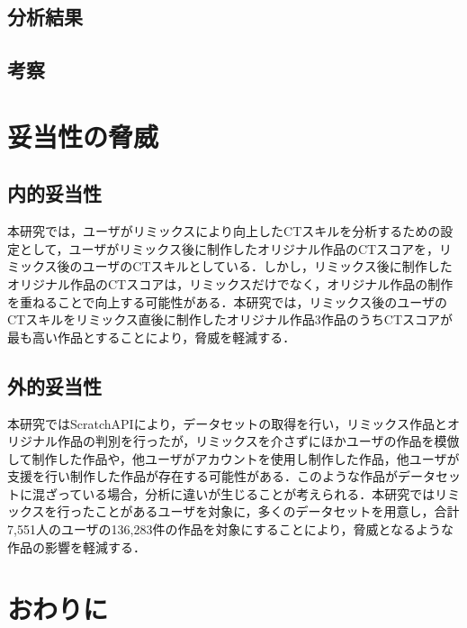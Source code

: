 \documentclass[11pt]{jreport}
\begin{document}
\section{分析結果}
\section{考察}


\chapter{妥当性の脅威}

\section{内的妥当性}
本研究では，ユーザがリミックスにより向上したCTスキルを分析するための設定として，ユーザがリミックス後に制作したオリジナル作品のCTスコアを，リミックス後のユーザのCTスキルとしている．しかし，リミックス後に制作したオリジナル作品のCTスコアは，リミックスだけでなく，オリジナル作品の制作を重ねることで向上する可能性がある．本研究では，リミックス後のユーザのCTスキルをリミックス直後に制作したオリジナル作品3作品のうちCTスコアが最も高い作品とすることにより，脅威を軽減する．

\section{外的妥当性}
本研究ではScratchAPIにより，データセットの取得を行い，リミックス作品とオリジナル作品の判別を行ったが，リミックスを介さずにほかユーザの作品を模倣して制作した作品や，他ユーザがアカウントを使用し制作した作品，他ユーザが支援を行い制作した作品が存在する可能性がある．このような作品がデータセットに混ざっている場合，分析に違いが生じることが考えられる．本研究ではリミックスを行ったことがあるユーザを対象に，多くのデータセットを用意し，合計7,551人のユーザの136,283件の作品を対象にすることにより，脅威となるような作品の影響を軽減する．

\chapter{おわりに}

\end{document}
